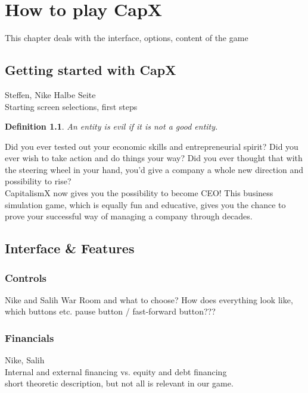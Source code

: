 \documentclass[11pt,titlepage,oneside,openany]{book}
\newtheorem{definition}{Definition}
\begin{document}
\chapter{How to play CapX}
\label{cha:theory}
 This chapter deals with the interface, options, content of the game

\section{Getting started with CapX}
Steffen, Nike
Halbe Seite\\

\label{sec:prelim}
Starting screen selections, first steps
\begin{definition}
\label{def:evil}
An entity is evil if it is not a good entity.
\end{definition}

Did you ever tested out your economic skills and entrepreneurial spirit? Did you ever wish to take action and do things your way? Did you ever thought that with the steering wheel in your hand, you'd give a company a whole new direction and possibility to rise? \\
CapitalismX now gives you the possibility to become CEO! This business simulation game, which is equally fun and educative, gives you the chance to prove your successful way of managing a company through decades.\\


\section{Interface \& Features}
\label{sec:good}

\subsection{Controls}  
Nike and Salih
War Room and what to choose? How does everything look like, which buttons etc. pause button / fast-forward button???\\
\subsection{Financials}
Nike, Salih\\
Internal and external financing vs. equity and debt financing\\ short theoretic description, but not all is relevant in our game. \\
\end{document}
